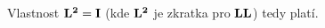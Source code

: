 \begin{enumerate}

    Vlastnost \( \bf{L}^2 = \bf{I} \) (kde \( \bf{L}^2 \) je zkratka pro \( \bf{L} \bf{L} \)) tedy platí.
\end{enumerate}